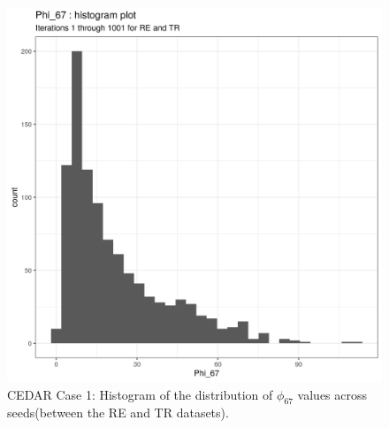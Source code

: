 \documentclass[12pt]{article} %
\begin{document}
	\begin{figure}[h]
		\centering
		\includegraphics[scale=0.75]{Images/Biology_data/Set_250/All_datasets/Phi_histograms/Phi_67_histogram_plot.png}
		\caption{CEDAR Case 1: Histogram of the distribution of $\phi_{67}$ values across seeds(between the RE and TR datasets).}
		\label{fig:results:cedar_1:mdi_re_tr_phi_histogram}
	\end{figure}
	
	\newpage
	
\end{document}
